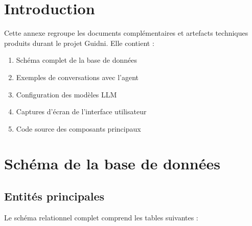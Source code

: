 
\section{Introduction}

Cette annexe regroupe les documents complémentaires et artefacts techniques produits durant le projet Guidni. Elle contient :

\begin{enumerate}
    \item Schéma complet de la base de données
    \item Exemples de conversations avec l'agent
    \item Configuration des modèles LLM
    \item Captures d'écran de l'interface utilisateur
    \item Code source des composants principaux
\end{enumerate}


\section{Schéma de la base de données}

\subsection{Entités principales}

Le schéma relationnel complet comprend les tables suivantes :

